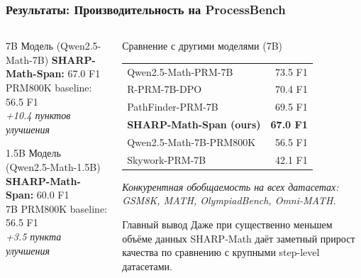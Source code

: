 \documentclass{beamer}
\begin{document}
\begin{frame}
  \frametitle{Результаты: Производительность на ProcessBench}
  \small
  
  \begin{columns}[T]
      \begin{column}{0.48\textwidth}
          \begin{block}{7B Модель (Qwen2.5-Math-7B)}
              \textbf{SHARP-Math-Span:} 67.0 F1 \\
              PRM800K baseline: 56.5 F1 \\
              \textit{+10.4 пунктов улучшения}
          \end{block}
          
          \begin{block}{1.5B Модель (Qwen2.5-Math-1.5B)}
              \textbf{SHARP-Math-Span:} 60.0 F1 \\
              7B PRM800K baseline: 56.5 F1 \\
              \textit{+3.5 пункта улучшения}
          \end{block}
      \end{column}
      
      \begin{column}{0.48\textwidth}
          \begin{block}{Сравнение с другими моделями (7B)}
              \scriptsize
              \begin{tabularx}{\linewidth}{Y r}
                  Qwen2.5-Math-PRM-7B & 73.5 F1 \\
                  R-PRM-7B-DPO & 70.4 F1 \\
                  PathFinder-PRM-7B & 69.5 F1 \\
                  \textbf{SHARP-Math-Span (ours)} & \textbf{67.0 F1} \\
                  Qwen2.5-Math-7B-PRM800K & 56.5 F1 \\
                  Skywork-PRM-7B & 42.1 F1 \\
              \end{tabularx}
          \end{block}
          \footnotesize \textit{Конкурентная обобщаемость на всех датасетах: GSM8K, MATH, OlympiadBench, Omni-MATH.}

          \begin{alertblock}{Главный вывод}
              Даже при существенно меньшем объёме данных SHARP-Math даёт заметный прирост качества по сравнению с крупными step-level датасетами.
          \end{alertblock}
      \end{column}
  \end{columns}
\end{frame}
\end{document}
